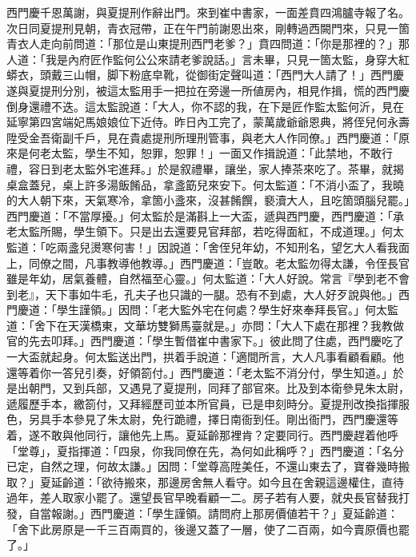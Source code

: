 西門慶千恩萬謝，與夏提刑作辭出門。來到崔中書家，一面差賁四鴻臚寺報了名。次日同夏提刑見朝，青衣冠帶，正在午門前謝恩出來，剛轉過西闕門來，只見一箇青衣人走向前問道：「那位是山東提刑西門老爹？」賁四問道：「你是那裡的？」那人道：「我是內府匠作監何公公來請老爹說話。」言未畢，只見一箇太監，身穿大紅蟒衣，頭戴三山帽，脚下粉底皁靴，從御街定聲叫道：「西門大人請了！」西門慶遂與夏提刑分別，被這太監用手一把拉在旁邊一所値房內，相見作揖，慌的西門慶倒身還禮不迭。這太監說道：「大人，你不認的我，在下是匠作監太監何沂，見在延寧第四宮端妃馬娘娘位下近侍。昨日內工完了，蒙萬歲爺爺恩典，將侄兒何永壽陞受金吾衛副千戶，見在貴處提刑所理刑管事，與老大人作同僚。」西門慶道：「原來是何老太監，學生不知，恕罪，恕罪！」一面又作揖說道：「此禁地，不敢行禮，容日到老太監外宅進拜。」於是叙禮畢，讓坐，家人捧茶來吃了。茶畢，就揭桌盒蓋兒，桌上許多湯飯餚品，拿盞筯兒來安下。何太監道：「不消小盃了，我曉的大人朝下來，天氣寒冷，拿箇小盞來，沒甚餚饌，褻瀆大人，且吃箇頭腦兒罷。」西門慶道：「不當厚擾。」何太監於是滿斟上一大盃，遞與西門慶，西門慶道：「承老太監所賜，學生領下。只是出去還要見官拜部，若吃得面紅，不成道理。」何太監道：「吃兩盞兒燙寒何害！」因說道：「舍侄兒年幼，不知刑名，望乞大人看我面上，同僚之間，凡事教導他教導。」西門慶道：「豈敢。老太監勿得太謙，令侄長官雖是年幼，居氣養體，自然福至心靈。」何太監道：「大人好說。常言『學到老不會到老』，天下事如牛毛，孔夫子也只識的一腿。{}恐有不到處，大人好歹說與他。」西門慶道：「學生謹領。」因問：「老大監外宅在何處？學生好來奉拜長官。」何太監道：「舍下在天漢橋東，文華坊雙獅馬臺就是。」亦問：「大人下處在那裡？我教做官的先去叩拜。」西門慶道：「學生暫借崔中書家下。」彼此問了住處，西門慶吃了一大盃就起身。何太監送出門，拱着手說道：「適間所言，大人凡事看顧看顧。他還等着你一答兒引奏，好領箚付。」西門慶道：「老太監不消分付，學生知道。」於是出朝門，又到兵部，又遇見了夏提刑，同拜了部官來。比及到本衛參見朱太尉，遞履歷手本，繳箚付，又拜經歷司並本所官員，已是申刻時分。夏提刑改換指揮服色，另具手本參見了朱太尉，免行跪禮，擇日南衙到任。剛出衙門，西門慶還等着，遂不敢與他同行，讓他先上馬。夏延齡那裡肯？定要同行。西門慶趕着他呼「堂尊」，夏指揮道：「四泉，你我同僚在先，為何如此稱呼？」西門慶道：「名分已定，自然之理，何故太謙。」因問：「堂尊高陞美任，不還山東去了，寶眷幾時搬取？」夏延齡道：「欲待搬來，那邊房舍無人看守。如今且在舍親這邊權住，直待過年，差人取家小罷了。還望長官早晚看顧一二。房子若有人要，就央長官替我打發，自當報謝。」西門慶道：「學生謹領。請問府上那房價値若干？」夏延齡道：「舍下此房原是一千三百兩買的，後邊又蓋了一層，使了二百兩，如今賣原價也罷了。」

